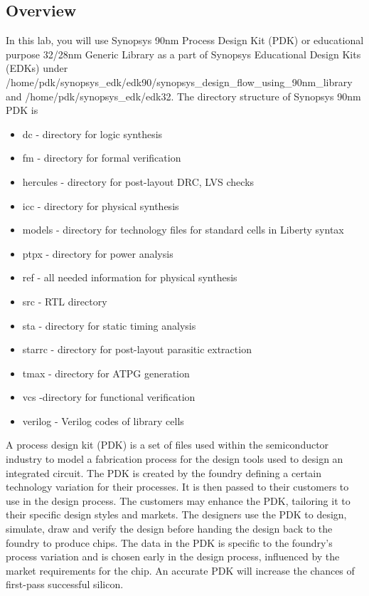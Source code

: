 \documentclass[a4paper,12pt,twoside]{article}
\begin{document}
\subsection{Overview}
In this lab, you will use Synopsys 90nm Process Design Kit (PDK) or educational purpose 32/28nm Generic Library as a part of Synopsys Educational Design Kits (EDKs) under /home/pdk/synopsys\_edk/edk90/synopsys\_design\_flow\_using\_90nm\_library and /home/pdk/synopsys\_edk/edk32. The directory structure of Synopsys 90nm PDK is
\begin{itemize}
    \item dc - directory for logic synthesis
    \item fm - directory for formal verification
    \item hercules - directory for post-layout DRC, LVS checks
    \item icc - directory for physical synthesis
    \item models - directory for technology files for standard cells in Liberty syntax
    \item ptpx - directory for power analysis
    \item ref - all needed information for physical synthesis
    \item src - RTL directory
    \item sta - directory for static timing analysis
    \item starrc - directory for post-layout parasitic extraction
    \item tmax - directory for ATPG generation
    \item vcs -directory for functional verification
    \item verilog -  Verilog codes of library cells
\end{itemize}
A process design kit (PDK) is a set of files used within the semiconductor industry to model a fabrication process for the design tools used to design an integrated circuit. The PDK is created by the foundry defining a certain technology variation for their processes. It is then passed to their customers to use in the design process. The customers may enhance the PDK, tailoring it to their specific design styles and markets. The designers use the PDK to design, simulate, draw and verify the design before handing the design back to the foundry to produce chips. The data in the PDK is specific to the foundry's process variation and is chosen early in the design process, influenced by the market requirements for the chip. An accurate PDK will increase the chances of first-pass successful silicon.
\end{document}
